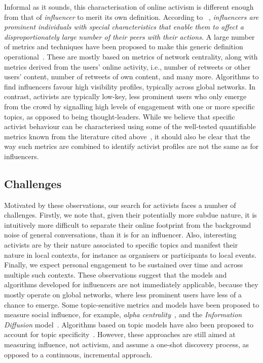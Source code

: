 \documentclass[runningheads]{llncs}
\begin{document}
Informal as it sounds, this characterisation of online activism is different enough from that of \textit{influencer} to merit its own definition.
According to ~\cite{Kardara2015}, \textit{influencers are prominent individuals with special characteristics that enable them to	affect a disproportionately large number of their peers with their actions.}
A large number of metrics and techniques have been proposed to make this generic definition operational~\cite{RIQUELME2016949}. These are mostly based on metrics of network centrality, along with metrics derived from the users' online activity, i.e., number of retweets or other users' content, number of retweets of own content, and many more.
%
Algorithms to find influencers favour high visibility profiles, typically across global networks.
In contrast, activists are typically low-key, less prominent users who only emerge from the crowd by signalling high levels of engagement with one or more specific topics, as opposed to being thought-leaders. 
%
While we believe that specific activist behaviour can be characterised using some of the well-tested quantifiable metrics known from the literature cited above~\cite{RIQUELME2016949}, it should also be clear that the way such metrics are combined to identify activist profiles are not the same as for influencers. 

\subsection{Challenges}

Motivated by these observations, our search for activists faces a number of challenges.
%
Firstly, we note that, given their potentially more subdue nature, it is intuitively more difficult to separate their online footprint from the background noise of general conversations, than it is for an influencer.
Also, interesting activists are by their nature associated to specific topics and manifest their nature in local contexts, for instance as organisers or participants to local events. 
Finally, we expect personal engagement to be sustained over time and across multiple such contexts. 
These observations suggest that the models and algorithms developed for influencers are not immediately applicable, because they mostly operate on global networks, where less prominent users have less of a chance to emerge.
Some topic-sensitive metrics and models have been proposed to measure social influence, for example, \textit{alpha centrality}~\cite{Bonacich2001,Overbey2013}, and the \textit{Information Diffusion} model~\cite{Pal2011}. Algorithms based on topic models have also been proposed to account for topic specificity~\cite{Zhao2011b}. However, these approaches are still aimed at measuring influence, not activism, and assume a one-shot discovery process, as opposed to a continuous, incremental approach.
\end{document}
